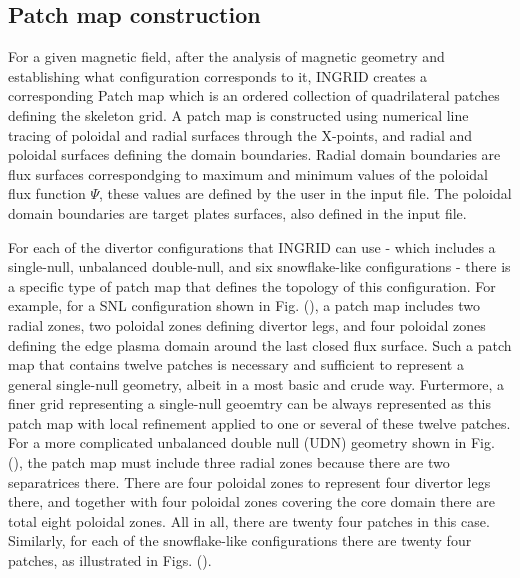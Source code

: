 \subsection{Patch map construction}

For a given magnetic field, after the analysis of magnetic geometry
and establishing what configuration corresponds to it, INGRID creates
a corresponding Patch map which is an ordered collection of
quadrilateral patches defining the skeleton grid. A patch map is
constructed using numerical line tracing of poloidal and radial
surfaces through the X-points, and radial and poloidal surfaces
defining the domain boundaries. Radial domain boundaries are flux
surfaces correspondging to maximum and minimum values of the poloidal
flux function $\Psi$, these values are defined by the user in the
input file. The poloidal domain boundaries are target plates surfaces,
also defined in the input file.

For each of the divertor configurations that INGRID can use - which
includes a single-null, unbalanced double-null, and six snowflake-like
configurations - there is a specific type of patch map that defines
the topology of this configuration. For example, for a SNL
configuration shown in Fig. (), a patch map includes two radial zones,
two poloidal zones defining divertor legs, and four poloidal zones
defining the edge plasma domain around the last closed flux
surface. Such a patch map that contains twelve patches is necessary
and sufficient to represent a general single-null geometry, albeit in
a most basic and crude way. Furtermore, a finer grid representing a
single-null geoemtry can be always represented as this patch map with
local refinement applied to one or several of these twelve patches.
For a more complicated unbalanced double null (UDN) geometry shown in
Fig. (), the patch map must include three radial zones because there
are two separatrices there. There are four poloidal zones to represent
four divertor legs there, and together with four poloidal zones
covering the core domain there are total eight poloidal zones. All in
all, there are twenty four patches in this case. Similarly, for each
of the snowflake-like configurations there are twenty four patches, as
illustrated in Figs. ().
